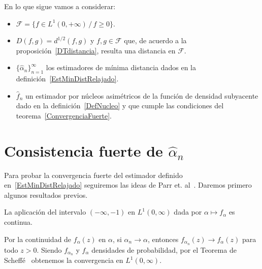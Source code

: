 \vspace{1cm}

En lo que sigue vamos a considerar:
\begin{itemize}
	\item $\mathcal{F}=\{f \in L^1(0,+\infty) \, / \, f \geq 0\}$.
	\item $D(f,g)=d^{1/2}(f,g)$ y $f,g \in \mathcal{F} $ que, de acuerdo a la proposición~\ref{DTdistancia}, resulta una distancia en $\mathcal{F}$.
	\item $\{\widehat{\alpha}_n\}_{n=1}^{\infty}$ los estimadores de mínima distancia dados en la definición~\eqref{EstMinDistRelajado}.
	\item $\widehat{f}_n$ un estimador por núcleos asimétricos de la función de densidad subyacente dado en la definición~\ref{DefNucleo} y que cumple las condiciones del teorema~\ref{ConvergenciaFuerte}.
\end{itemize}

\section{Consistencia fuerte de $\widehat{\alpha}_{n}$}

\vspace{0.5cm}

Para probar la convergencia fuerte del estimador definido en~\eqref{EstMinDistRelajado} seguiremos las ideas de Parr et. al~\cite{parr1982}. Daremos primero algunos resultados previos.

\begin{proposition}
	\label{continuidad}
	La aplicación del intervalo $(-\infty,-1)$ en $L^{1}(0,\infty)$ dada por
	$\alpha \mapsto f_{\alpha}$ es continua.
\end{proposition}
\begin{dem}
	Por la continuidad de $f_{\alpha}(z)$ en $\alpha$, si $\alpha_{n} \to \alpha$, 
	entonces $f_{\alpha_{n}}(z) \to f_{\alpha}(z)$ para todo $z>0$.
	Siendo $f_{\alpha_{n}}$ y $f_{\alpha}$ densidades de probabilidad, por el Teorema de Scheffé~\cite{scheffe1947} obtenemos
	la convergencia en $L^{1}(0,\infty)$.
\end{dem}

